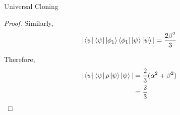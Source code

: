 \begin{solution}{Universal Cloning}
\begin{proof}
    Similarly, \begin{equation*}
        |\bra{\psi}\bra{\psi}\ket{\phi_1}\bra{\phi_1}\ket{\psi}\ket{\psi}| = \frac{2\beta^2}{3}
    \end{equation*}

    Therefore, 
    \begin{equation*}
        \begin{split}
        |\bra{\psi}\bra{\psi}\rho\ket{\psi}\ket{\psi}| &= \frac{2}{3}(\alpha^2+\beta^2)\\
        &= \frac{2}{3}
        \end{split}
    \end{equation*}
    \end{proof}
\end{solution}
 